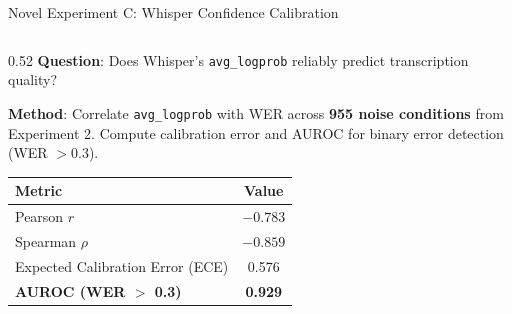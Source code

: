 \documentclass[aspectratio=169]{beamer}
\begin{document}
\begin{frame}{Novel Experiment C: Whisper Confidence Calibration}
  \begin{columns}[T]
    \begin{column}{0.52\textwidth}
      \textbf{Question}: Does Whisper's \texttt{avg\_logprob} reliably predict transcription quality?

      \vspace{0.2cm}
      \textbf{Method}: Correlate \texttt{avg\_logprob} with WER across \textbf{955 noise conditions} from Experiment 2. Compute calibration error and AUROC for binary error detection (WER $> 0.3$).

      \vspace{0.2cm}
      \begin{center}
        \begin{tabular}{@{}lc@{}}
          \toprule
          \textbf{Metric} & \textbf{Value} \\
          \midrule
          Pearson $r$ & $-0.783$ \\
          Spearman $\rho$ & $-0.859$ \\
          Expected Calibration Error (ECE) & 0.576 \\
          \rowcolor{lightgray}
          \textbf{AUROC (WER $>$ 0.3)} & \textbf{0.929} \\
          \bottomrule
        \end{tabular}
      \end{center}


\end{column}
\end{columns}
\end{frame}
\end{document}

